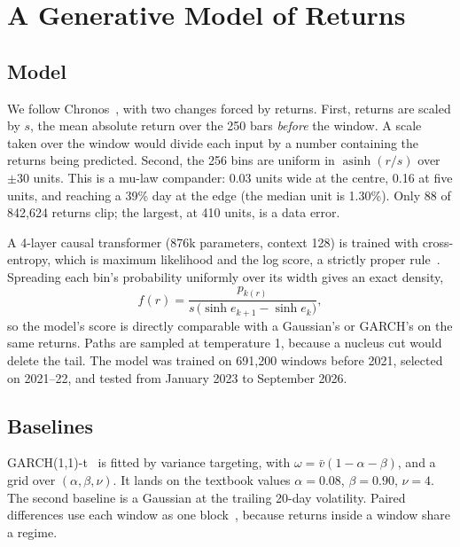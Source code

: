 \documentclass[conference]{IEEEtran}
\begin{document}
\section{A Generative Model of Returns}
\label{sec:returns}
\subsection{Model}
We follow Chronos~\cite{ansari2024chronos}, with two changes forced by returns. First, returns are
scaled by $s$, the mean absolute return over the 250 bars \emph{before} the window. A scale taken
over the window would divide each input by a number containing the returns being predicted. Second,
the 256 bins are uniform in $\operatorname{asinh}(r/s)$ over $\pm 30$ units. This is a mu-law
compander: 0.03 units wide at the centre, 0.16 at five units, and reaching a 39\% day at the edge
(the median unit is 1.30\%). Only 88 of 842{,}624 returns clip; the largest, at 410 units, is a data error.

A 4-layer causal transformer (876k parameters, context 128) is trained with cross-entropy, which is
maximum likelihood and the log score, a strictly proper rule~\cite{Gneiting_2007}. Spreading each bin's
probability uniformly over its width gives an exact density,
\begin{equation}
f(r) = \frac{p_{k(r)}}{s\,\bigl(\sinh e_{k+1} - \sinh e_k\bigr)},
\end{equation}
so the model's score is directly comparable with a Gaussian's or GARCH's on the same returns. Paths
are sampled at temperature 1, because a nucleus cut would delete the tail. The model was trained on
691{,}200 windows before 2021, selected on 2021--22, and tested from January 2023 to September 2026.

\subsection{Baselines}
GARCH(1,1)-t~\cite{Bollerslev_1986,Bollerslev_1987} is fitted by variance targeting, with
$\omega = \bar v(1-\alpha-\beta)$, and a grid over $(\alpha,\beta,\nu)$. It lands on the textbook
values $\alpha = 0.08$, $\beta = 0.90$, $\nu = 4$. The second baseline is a Gaussian at the trailing
20-day volatility. Paired differences use each window as one block~\cite{Diebold_1995}, because
returns inside a window share a regime.
\end{document}

